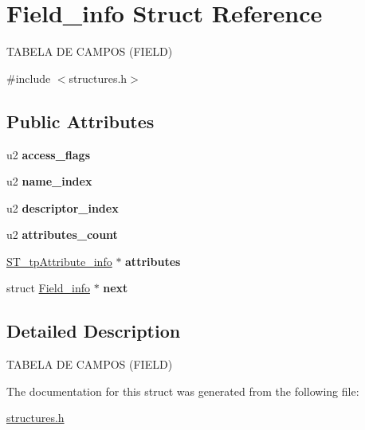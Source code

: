 \hypertarget{structField__info}{}\section{Field\+\_\+info Struct Reference}
\label{structField__info}




 T\+A\+B\+E\+LA DE C\+A\+M\+P\+OS (F\+I\+E\+LD)  




{\ttfamily \#include $<$structures.\+h$>$}

\subsection*{Public Attributes}
\begin{DoxyCompactItemize}
\item 
\mbox{\label{structField__info_aa23532a5577624b81550ffff8801ef4f}} 
u2 {\bfseries access\+\_\+flags}
\item 
\mbox{\label{structField__info_ab08cf316ad4af84d9a6dfd12bbbdc0fc}} 
u2 {\bfseries name\+\_\+index}
\item 
\mbox{\label{structField__info_a6513dda6705b584d2da444ee32ea5283}} 
u2 {\bfseries descriptor\+\_\+index}
\item 
\mbox{\label{structField__info_a4f9e6178d09bb7ce6e32d26e5247bc55}} 
u2 {\bfseries attributes\+\_\+count}
\item 
\mbox{\label{structField__info_afe96fa3a646a1e739c8d8d4af9ad15cb}} 
\mbox{\hyperlink{structures_8h_a4ad50728b2ffc8af625f1237e03bc9e0}{S\+T\+\_\+tp\+Attribute\+\_\+info}} $\ast$ {\bfseries attributes}
\item 
\mbox{\label{structField__info_a1a1695382a486f08cbc32342a03c1e66}} 
struct \mbox{\hyperlink{structField__info}{Field\+\_\+info}} $\ast$ {\bfseries next}
\end{DoxyCompactItemize}


\subsection{Detailed Description}


 T\+A\+B\+E\+LA DE C\+A\+M\+P\+OS (F\+I\+E\+LD) 

The documentation for this struct was generated from the following file\+:\begin{DoxyCompactItemize}
\item 
\mbox{\hyperlink{structures_8h}{structures.\+h}}\end{DoxyCompactItemize}
